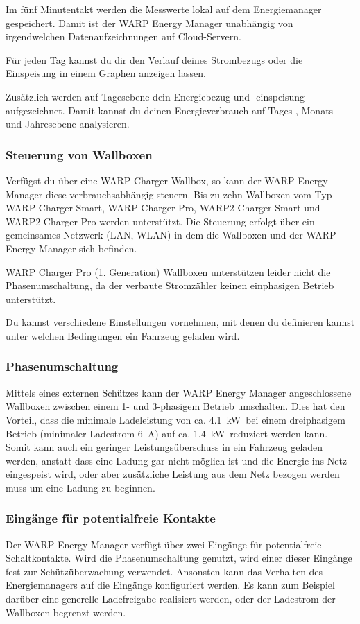 \documentclass[a4paper,10pt]{article}
\newcommand{\hint}[1]{\begin{tcolorbox}[colback=boxgray,colframe=black,coltext=
white,title=Hinweis,left*=2mm,right*=2mm,boxsep=1mm,bottom=1mm,top=1mm]#1\end{tcolorbox}}
\begin{document}
\begin{multicols*}{2}
	Im fünf Minutentakt werden die Messwerte lokal auf dem 
	Energiemanager gespeichert. Damit ist der WARP Energy Manager unabhängig 
	von irgendwelchen Datenaufzeichnungen auf Cloud-Servern.

	Für jeden Tag kannst du dir den Verlauf deines Strombezugs oder die
	Einspeisung in einem Graphen anzeigen lassen.

	Zusätzlich werden auf Tagesebene dein Energiebezug und -einspeisung
	aufgezeichnet. Damit kannst du deinen Energieverbrauch auf Tages-, Monats- und
	Jahresebene analysieren.

	\subsubsection{Steuerung von Wallboxen}
	Verfügst du über eine WARP Charger Wallbox, so kann der WARP Energy Manager
	diese verbrauchsabhängig steuern. Bis zu zehn Wallboxen vom Typ WARP Charger Smart, 
	WARP Charger Pro, WARP2 Charger Smart und WARP2 Charger Pro werden unterstützt. Die
	Steuerung erfolgt über ein gemeinsames Netzwerk (LAN, WLAN) in dem die
	Wallboxen und der WARP Energy Manager sich befinden.

	\hint{WARP Charger Pro (1. Generation) Wallboxen unterstützen leider nicht die
	Phasenumschaltung, da der verbaute Stromzähler keinen einphasigen Betrieb
	unterstützt.}

	Du kannst verschiedene Einstellungen vornehmen, mit denen du definieren
	kannst unter welchen Bedingungen ein Fahrzeug geladen wird.

	\subsubsection{Phasenumschaltung}
	Mittels eines externen Schützes kann der WARP Energy Manager
	angeschlossene Wallboxen zwischen einem 1- und 3-phasigem Betrieb
	umschalten. 
	Dies hat den Vorteil, dass die minimale Ladeleistung von ca.
	\SI{4.1}{\kilo\watt}~bei einem dreiphasigem Betrieb (minimaler Ladestrom
	\SI{6}{\ampere}) auf ca. \SI{1.4}{\kilo\watt}~reduziert werden kann. Somit
	kann auch ein geringer Leistungsüberschuss in ein Fahrzeug geladen werden,
	anstatt dass eine Ladung gar nicht möglich ist und die Energie ins Netz 
	eingespeist wird, oder aber zusätzliche Leistung aus dem Netz bezogen werden 
	muss um eine Ladung zu beginnen.

	\subsubsection{Eingänge für potentialfreie Kontakte}
	Der WARP Energy Manager verfügt über zwei Eingänge für potentialfreie
	Schaltkontakte. Wird die Phasenumschaltung genutzt, wird einer dieser
	Eingänge fest zur Schützüberwachung verwendet. Ansonsten kann das Verhalten
	des Energiemanagers auf die Eingänge konfiguriert werden. Es kann zum
	Beispiel darüber eine generelle Ladefreigabe realisiert werden, oder der
	Ladestrom der Wallboxen begrenzt werden.


\end{multicols*}
\end{document}
